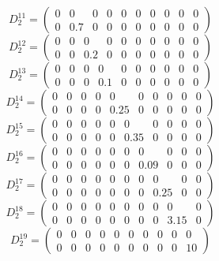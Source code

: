 \documentclass[a4paper,12pt]{article}
\begin{document}
\[
D^{11}_2 = \begin{pmatrix}
    0 & 0 & 0 & 0 & 0 & 0 & 0 & 0 & 0 & 0 \\
    0 & 0.7 & 0 & 0 & 0 & 0 & 0 & 0 & 0 & 0
\end{pmatrix}
\]
\[
D^{12}_2 = \begin{pmatrix}
    0 & 0 & 0 & 0 & 0 & 0 & 0 & 0 & 0 & 0 \\
    0 & 0 & 0.2 & 0 & 0 & 0 & 0 & 0 & 0 & 0
\end{pmatrix}
\]
\[
D^{13}_2 = \begin{pmatrix}
    0 & 0 & 0 & 0 & 0 & 0 & 0 & 0 & 0 & 0 \\
    0 & 0 & 0 & 0.1 & 0 & 0 & 0 & 0 & 0 & 0
\end{pmatrix}
\]
\[
D^{14}_2 = \begin{pmatrix}
    0 & 0 & 0 & 0 & 0 & 0 & 0 & 0 & 0 & 0 \\
    0 & 0 & 0 & 0 & 0.25 & 0 & 0 & 0 & 0 & 0
\end{pmatrix}
\]
\[
D^{15}_2 = \begin{pmatrix}
    0 & 0 & 0 & 0 & 0 & 0 & 0 & 0 & 0 & 0 \\
    0 & 0 & 0 & 0 & 0 & 0.35 & 0 & 0 & 0 & 0
\end{pmatrix}
\]
\[
D^{16}_2 = \begin{pmatrix}
    0 & 0 & 0 & 0 & 0 & 0 & 0 & 0 & 0 & 0 \\
    0 & 0 & 0 & 0 & 0 & 0 & 0.09 & 0 & 0 & 0
\end{pmatrix}
\]
\[
D^{17}_2 = \begin{pmatrix}
    0 & 0 & 0 & 0 & 0 & 0 & 0 & 0 & 0 & 0 \\
    0 & 0 & 0 & 0 & 0 & 0 & 0 & 0.25 & 0 & 0
\end{pmatrix}
\]
\[
D^{18}_2 = \begin{pmatrix}
    0 & 0 & 0 & 0 & 0 & 0 & 0 & 0 & 0 & 0 \\
    0 & 0 & 0 & 0 & 0 & 0 & 0 & 0 & 3.15 & 0
\end{pmatrix}
\]
\[
D^{19}_2 = \begin{pmatrix}
    0 & 0 & 0 & 0 & 0 & 0 & 0 & 0 & 0 & 0 \\
    0 & 0 & 0 & 0 & 0 & 0 & 0 & 0 & 0 & 10
\end{pmatrix}
\]

\newpage
\end{document}
